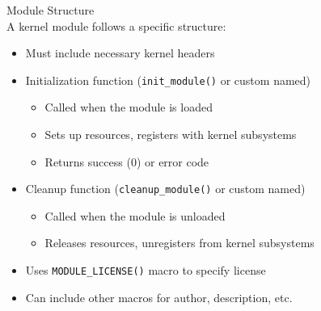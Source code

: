 \begin{definition}{Module Structure}\\
    A kernel module follows a specific structure:
    \begin{itemize}
        \item Must include necessary kernel headers
        \item Initialization function (\texttt{init\_module()} or custom named)
            \begin{itemize}
                \item Called when the module is loaded
                \item Sets up resources, registers with kernel subsystems
                \item Returns success (0) or error code
            \end{itemize}
        \item Cleanup function (\texttt{cleanup\_module()} or custom named)
            \begin{itemize}
                \item Called when the module is unloaded
                \item Releases resources, unregisters from kernel subsystems
            \end{itemize}
        \item Uses \texttt{MODULE\_LICENSE()} macro to specify license
        \item Can include other macros for author, description, etc.
    \end{itemize}
\end{definition}

